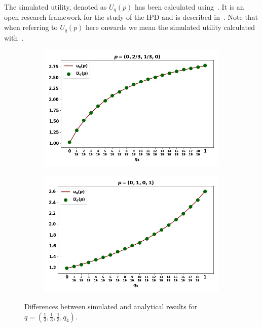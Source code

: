 \documentclass[10pt]{article}
\begin{document}
The simulated utility, denoted
as \(U_q(p)\) has been calculated using~\cite{axelrodproject}. It is an open research
framework for the study of the IPD and is described in~\cite{Knight2016}. Note that
when referring to \(U_q(p)\) here onwards we mean the simulated utility calculated
with~\cite{axelrodproject}.

\begin{figure}[!htbp]
\begin{center}
    \begin{subfigure}{0.45\textwidth}
        \includegraphics[width=\linewidth]{img/validation_img_two.png}
    \end{subfigure}
    \begin{subfigure}{0.45\textwidth}
        \includegraphics[width=\linewidth]{img/validation_img_three.png}
    \end{subfigure}
\end{center}
\caption{Differences between simulated and analytical results for
\(q = (\frac{1}{3}, \frac{1}{3}, \frac{1}{3}, q_4)\).}
\label{fig:analytical_simulated}
\end{figure}
\end{document}
